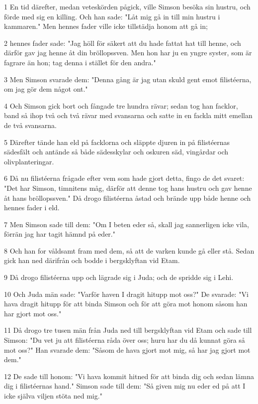 \par 1 En tid därefter, medan veteskörden pågick, ville Simson besöka sin hustru, och förde med sig en killing. Och han sade: "Låt mig gå in till min hustru i kammaren." Men hennes fader ville icke tillstädja honom att gå in;
\par 2 hennes fader sade: "Jag höll för säkert att du hade fattat hat till henne, och därför gav jag henne åt din bröllopssven. Men hon har ju en yngre syster, som är fagrare än hon; tag denna i stället för den andra."
\par 3 Men Simson svarade dem: "Denna gång är jag utan skuld gent emot filistéerna, om jag gör dem något ont."
\par 4 Och Simson gick bort och fångade tre hundra rävar; sedan tog han facklor, band så ihop två och två rävar med svansarna och satte in en fackla mitt emellan de två svansarna.
\par 5 Därefter tände han eld på facklorna och släppte djuren in på filistéernas sädesfält och antände så både sädesskylar och oskuren säd, vingårdar och olivplanteringar.
\par 6 Då nu filistéerna frågade efter vem som hade gjort detta, fingo de det svaret: "Det har Simson, timnitens måg, därför att denne tog hans hustru och gav henne åt hans bröllopssven." Då drogo filistéerna åstad och brände upp både henne och hennes fader i eld.
\par 7 Men Simson sade till dem: "Om I beten eder så, skall jag sannerligen icke vila, förrän jag har tagit hämnd på eder."
\par 8 Och han for våldsamt fram med dem, så att de varken kunde gå eller stå. Sedan gick han ned därifrån och bodde i bergsklyftan vid Etam.
\par 9 Då drogo filistéerna upp och lägrade sig i Juda; och de spridde sig i Lehi.
\par 10 Och Juda män sade: "Varför haven I dragit hitupp mot oss?" De svarade: "Vi hava dragit hitupp för att binda Simson och för att göra mot honom såsom han har gjort mot oss."
\par 11 Då drogo tre tusen män från Juda ned till bergsklyftan vid Etam och sade till Simson: "Du vet ju att filistéerna råda över oss; huru har du då kunnat göra så mot oss?" Han svarade dem: "Såsom de hava gjort mot mig, så har jag gjort mot dem."
\par 12 De sade till honom: "Vi hava kommit hitned för att binda dig och sedan lämna dig i filistéernas hand." Simson sade till dem: "Så given mig nu eder ed på att I icke själva viljen stöta ned mig."
